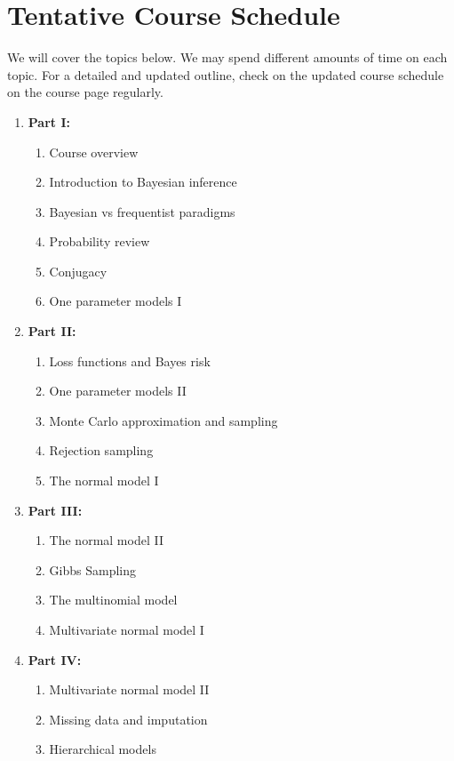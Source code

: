 \documentclass[11pt, a4paper]{article}
\begin{document}
\section{Tentative Course Schedule} 
We will cover the topics below. We may spend different amounts of time on each topic. For a detailed and updated outline, check on the updated course schedule on the course page regularly. 
\begin{enumerate}[label= {\color{darkblue}{\ArrowBoldRightStrobe}}]
	\item \textbf{Part I: }
	\begin{enumerate}[label= {\color{cyan}{\Rectangle}}]
		\item Course overview
		\item Introduction to Bayesian inference
		\item Bayesian vs frequentist paradigms
		\item Probability review
		\item Conjugacy
		\item One parameter models I
	\end{enumerate}
	\item \textbf{Part II: }
	\begin{enumerate}[label= {\color{cyan}{\Rectangle}}]
		\item Loss functions and Bayes risk
		\item One parameter models II
		\item Monte Carlo approximation and sampling
		\item Rejection sampling
		\item The normal model I
	\end{enumerate}
	\item \textbf{Part III: }
	\begin{enumerate}[label= {\color{cyan}{\Rectangle}}]
		\item The normal model II
		\item Gibbs Sampling
		\item The multinomial model
		\item Multivariate normal model I
	\end{enumerate}
	\item \textbf{Part IV: }
	\begin{enumerate}[label= {\color{cyan}{\Rectangle}}]
		\item Multivariate normal model II
		\item Missing data and imputation
		\item Hierarchical models

\end{enumerate}
\end{enumerate}
\end{document}
